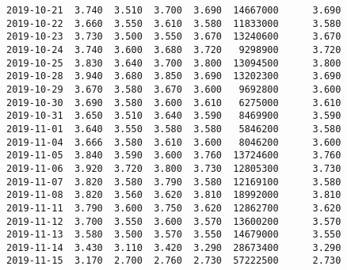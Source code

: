 \documentclass[11pt]{article}
\begin{document}
\begin{Verbatim}[commandchars=\\\{\}]
2019-10-21  3.740  3.510  3.700  3.690  14667000      3.690
2019-10-22  3.660  3.550  3.610  3.580  11833000      3.580
2019-10-23  3.730  3.500  3.550  3.670  13240600      3.670
2019-10-24  3.740  3.600  3.680  3.720   9298900      3.720
2019-10-25  3.830  3.640  3.700  3.800  13094500      3.800
2019-10-28  3.940  3.680  3.850  3.690  13202300      3.690
2019-10-29  3.670  3.580  3.670  3.600   9692800      3.600
2019-10-30  3.690  3.580  3.600  3.610   6275000      3.610
2019-10-31  3.650  3.510  3.640  3.590   8469900      3.590
2019-11-01  3.640  3.550  3.580  3.580   5846200      3.580
2019-11-04  3.666  3.580  3.610  3.600   8046200      3.600
2019-11-05  3.840  3.590  3.600  3.760  13724600      3.760
2019-11-06  3.920  3.720  3.800  3.730  12805300      3.730
2019-11-07  3.820  3.580  3.790  3.580  12169100      3.580
2019-11-08  3.820  3.560  3.620  3.810  18992000      3.810
2019-11-11  3.790  3.600  3.750  3.620  12862700      3.620
2019-11-12  3.700  3.550  3.600  3.570  13600200      3.570
2019-11-13  3.580  3.500  3.570  3.550  14679000      3.550
2019-11-14  3.430  3.110  3.420  3.290  28673400      3.290
2019-11-15  3.170  2.700  2.760  2.730  57222500      2.730


\end{Verbatim}
\end{document}
